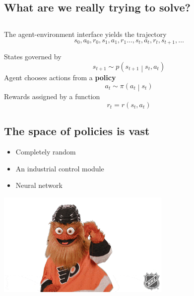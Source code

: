 \documentclass[
  letterpaper,
  DIV=11,
  numbers=noendperiod,
  oneside]{scrartcl}
\providecommand{\tightlist}{%
  \setlength{\itemsep}{0pt}\setlength{\parskip}{0pt}}\usepackage{longtable,booktabs,array}
\begin{document}

\subsection{What are we really trying to
solve?}\label{what-are-we-really-trying-to-solve}

\subsection{}\label{section-3}

The agent-environment interface yields the trajectory
\[s_0, a_0, r_0, s_1, a_1, r_1 \ldots, s_{t}, a_{t}, r_{t}, s_{t+1}, \ldots\]

States governed by
\[s_{t+1} \sim p \left( s_{t+1} \middle| s_t, a_t \right)\] Agent
chooses actions from a \textbf{policy}
\[a_t \sim \pi\left( a_t \middle| s_t \right)\] Rewards assigned by a
function \[r_t = r(s_t, a_t)\]

\subsection{The space of policies is
vast}\label{the-space-of-policies-is-vast}

\begin{itemize}
\tightlist
\item
  Completely random
\item
  An industrial control module
\item
  Neural network
\end{itemize}

\begin{center}
\includegraphics[width=\textwidth,height=1.97917in]{figs/gritty.gif}
\end{center}
\end{document}
